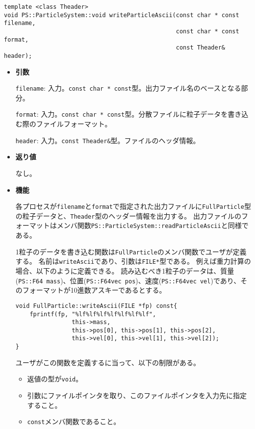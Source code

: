 
\begin{screen}
\begin{verbatim}
template <class Theader>
void PS::ParticleSystem::void writeParticleAscii(const char * const filename,
                                                 const char * const format,
                                                 const Theader& header);
\end{verbatim}
\end{screen}

\begin{itemize}

\item{{\bf 引数}}

{\tt filename}: 入力。{\tt const char * const}型。出力ファイル名のベースとなる部分。

{\tt format}: 入力。{\tt const char * const}型。分散ファイルに粒子データを書き込む際のファイルフォーマット。

{\tt header}: 入力。{\tt const Theader\&}型。ファイルのヘッダ情報。

\item{{\bf 返り値}}

なし。

\item{{\bf 機能}}

各プロセスが{\tt filename}と{\tt format}で指定された出力ファイルに{\tt FullParticle}型の粒子データと、{\tt Theader}型のヘッダー情報を出力する。
出力ファイルのフォーマットはメンバ関数\verb|PS::ParticleSystem::readParticleAscii|と同様である。

1粒子のデータを書き込む関数は{\tt FullParticle}のメンバ関数でユーザが定義する。
名前は{\tt writeAscii}であり、引数は{\tt FILE*}型である。
例えば重力計算の場合、以下のように定義できる。
読み込むべき1粒子のデータは、質量(\verb|PS::F64 mass|)、位置(\verb|PS::F64vec pos|)、速度(\verb|PS::F64vec vel|)であり、そのフォーマットが10進数アスキーであるとする。

\begin{verbatim}
void FullParticle::writeAscii(FILE *fp) const{
    fprintf(fp, "%lf%lf%lf%lf%lf%lf%lf",
                this->mass,
                this->pos[0], this->pos[1], this->pos[2],
                this->vel[0], this->vel[1], this->vel[2]);
}
\end{verbatim}

ユーザがこの関数を定義するに当って、以下の制限がある。
\begin{itemize}
\item 返値の型が\verb|void|。
\item 引数にファイルポインタを取り、このファイルポインタを入力先に指定すること。
\item \verb|const|メンバ関数であること。
\end{itemize}


\end{itemize}
